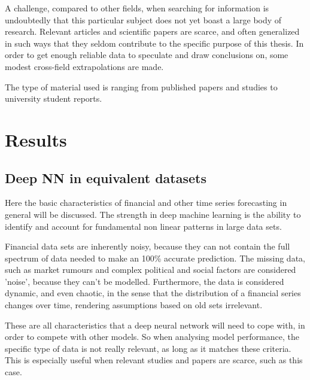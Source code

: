 
A challenge, compared to other fields, when searching for information is undoubtedly that this particular subject does not yet boast a large body of research. Relevant articles and scientific papers are scarce, and often generalized in such ways that they seldom contribute to the specific purpose of this thesis. In order to get enough reliable data to speculate and draw conclusions on, some modest cross-field extrapolations are made.

The type of material used is ranging from published papers and studies to university student reports.



\newpage

\section{Results}
\subsection{Deep NN in equivalent datasets}

Here the basic characteristics of financial and other time series forecasting in general will be discussed.
The strength in deep machine learning is the ability to identify and account for fundamental non linear patterns in large data sets.

Financial data sets are inherently noisy, because they can not contain the full spectrum of data needed to make an 100\% accurate prediction. The missing data, such as market rumours and complex political and social factors are considered 'noise', because they can't be modelled. Furthermore, the data is considered dynamic, and even chaotic, in the sense that the distribution of a financial series changes over time, rendering assumptions based on old sets irrelevant. 

These are all characteristics that a deep neural network will need to cope with, in order to compete with other models. So when analysing model performance, the  specific type of data is not really relevant, as long as it matches these criteria. This is especially useful when relevant studies and papers are scarce, such as this case.

